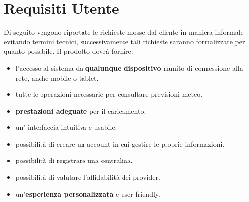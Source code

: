 	\section{Requisiti Utente}
	Di seguito vengono riportate le richieste mosse dal cliente in maniera informale evitando termini tecnici, successivamente tali richieste saranno formalizzate per quanto possibile.
	Il prodotto dovrà fornire: 
		\begin{itemize}
            \item l'accesso al sistema da \textbf{qualunque dispositivo} munito di connessione alla rete, anche mobile o tablet.
            \item tutte le operazioni necessarie per consultare previsioni meteo.
            \item \textbf{prestazioni adeguate} per il caricamento.
            \item un' interfaccia intuitiva e usabile.
            \item possibilità di creare un account in cui gestire le proprie informazioni.
            \item possibilità di registrare una centralina.
            \item possibilità di valutare l'affidabilità dei provider.
            \item un'\textbf{esperienza personalizzata} e user-friendly.
        \end{itemize}
